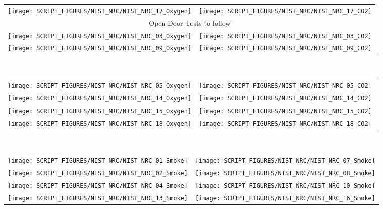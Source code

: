 \clearpage

\begin{figure}[p]
\begin{tabular*}{\textwidth}{l@{\extracolsep{\fill}}r}
\texttt{[image: SCRIPT\_FIGURES/NIST\_NRC/NIST\_NRC\_17\_Oxygen]} &
\texttt{[image: SCRIPT\_FIGURES/NIST\_NRC/NIST\_NRC\_17\_CO2]} \\
\multicolumn{2}{c}{Open Door Tests to follow} \\
\texttt{[image: SCRIPT\_FIGURES/NIST\_NRC/NIST\_NRC\_03\_Oxygen]} &
\texttt{[image: SCRIPT\_FIGURES/NIST\_NRC/NIST\_NRC\_03\_CO2]} \\
\texttt{[image: SCRIPT\_FIGURES/NIST\_NRC/NIST\_NRC\_09\_Oxygen]} &
\texttt{[image: SCRIPT\_FIGURES/NIST\_NRC/NIST\_NRC\_09\_CO2]}
\end{tabular*}\
\end{figure}

\begin{figure}[p]
\begin{tabular*}{\textwidth}{l@{\extracolsep{\fill}}r}
\texttt{[image: SCRIPT\_FIGURES/NIST\_NRC/NIST\_NRC\_05\_Oxygen]} &
\texttt{[image: SCRIPT\_FIGURES/NIST\_NRC/NIST\_NRC\_05\_CO2]} \\
\texttt{[image: SCRIPT\_FIGURES/NIST\_NRC/NIST\_NRC\_14\_Oxygen]} &
\texttt{[image: SCRIPT\_FIGURES/NIST\_NRC/NIST\_NRC\_14\_CO2]} \\
\texttt{[image: SCRIPT\_FIGURES/NIST\_NRC/NIST\_NRC\_15\_Oxygen]} &
\texttt{[image: SCRIPT\_FIGURES/NIST\_NRC/NIST\_NRC\_15\_CO2]} \\
\texttt{[image: SCRIPT\_FIGURES/NIST\_NRC/NIST\_NRC\_18\_Oxygen]} &
\texttt{[image: SCRIPT\_FIGURES/NIST\_NRC/NIST\_NRC\_18\_CO2]}
\end{tabular*}\
\end{figure}

\clearpage

\begin{figure}[p]
\begin{tabular*}{\textwidth}{l@{\extracolsep{\fill}}r}
\texttt{[image: SCRIPT\_FIGURES/NIST\_NRC/NIST\_NRC\_01\_Smoke]} &
\texttt{[image: SCRIPT\_FIGURES/NIST\_NRC/NIST\_NRC\_07\_Smoke]} \\
\texttt{[image: SCRIPT\_FIGURES/NIST\_NRC/NIST\_NRC\_02\_Smoke]} &
\texttt{[image: SCRIPT\_FIGURES/NIST\_NRC/NIST\_NRC\_08\_Smoke]} \\
\texttt{[image: SCRIPT\_FIGURES/NIST\_NRC/NIST\_NRC\_04\_Smoke]} &
\texttt{[image: SCRIPT\_FIGURES/NIST\_NRC/NIST\_NRC\_10\_Smoke]} \\
\texttt{[image: SCRIPT\_FIGURES/NIST\_NRC/NIST\_NRC\_13\_Smoke]} &
\texttt{[image: SCRIPT\_FIGURES/NIST\_NRC/NIST\_NRC\_16\_Smoke]}
\end{tabular*}\
\label{NIST_NRC_Smoke_Closed}
\end{figure}

